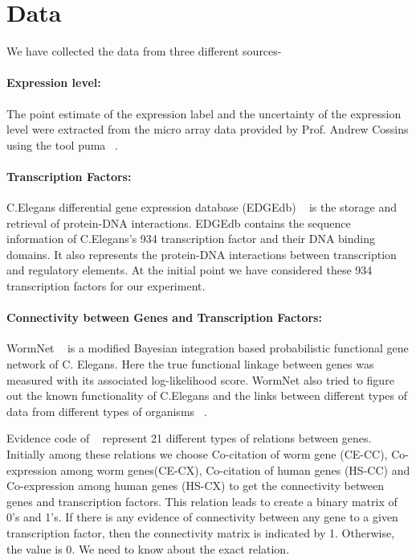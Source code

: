 \documentclass[12pt]{article}
\begin{document}
	
\section{Data}\label{data}

We have collected the data from three different sources-
	
\paragraph{Expression level:}
The point estimate of the expression label and the uncertainty of the expression level were 
extracted from the micro array data provided by Prof. Andrew Cossins using the tool puma ~\cite{puma}.  


\paragraph{Transcription Factors:}
C.Elegans differential gene expression database (EDGEdb) ~\cite{edgedb:01} is the storage and retrieval 
of protein-DNA interactions. EDGEdb contains the sequence information of C.Elegans's 934 transcription
factor and their DNA binding domains. It also represents the protein-DNA interactions between transcription
and regulatory elements. At the initial point we have considered these 934 transcription factors for 
our experiment. 


\paragraph{Connectivity between Genes and Transcription Factors:}
WormNet ~\cite{wormnet:url} is a modified Bayesian integration based probabilistic functional gene network of C. Elegans.
Here the true functional linkage between genes was measured with its associated log-likelihood score.
WormNet also tried to figure out the known functionality of C.Elegans and the links between 
different types of data from different types of organisms ~\cite{wormnet:01, wormnet:02}.

Evidence code of ~\cite{wormnet:url} represent 21 different types of relations between genes.
Initially among these relations we choose Co-citation of worm gene (CE-CC), Co-expression among worm genes(CE-CX),
Co-citation of human genes (HS-CC) and Co-expression among human genes (HS-CX) to get the connectivity between genes 
and transcription factors. This relation leads to create a binary matrix of 0's and 1's. If there is any
evidence of connectivity between any gene to a given transcription factor, then the connectivity matrix
is indicated by 1. Otherwise, the value is 0. We need to know about the exact relation. 
\end{document}
